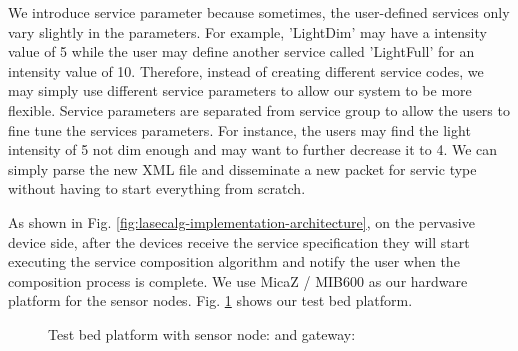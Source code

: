 We introduce service parameter because sometimes, the user-defined services only vary slightly in the parameters. For example, 'LightDim' may have a intensity value of 5 while the user may define another service called 'LightFull' for an intensity value of 10. Therefore, instead of creating different service codes, we may simply use different service parameters to allow our system to be more flexible. Service parameters are separated from service group to allow the users to fine tune the services parameters. For instance, the users may find the light intensity of 5 not dim enough and may want to further decrease it to 4. We can simply parse the new XML file and disseminate a new packet for servic type without having to start everything from scratch.

As shown in Fig. \ref{fig:lasecalg-implementation-architecture}, on the pervasive device side, after the devices receive the service specification they will start executing the service composition algorithm and notify the user when the composition process is complete. We use MicaZ / MIB600 as our hardware platform for the sensor nodes. Fig. \ref{fig:lasecalg-implementation-hardware} shows our test bed platform.

\begin{figure}
\centering
{}
\qquad
{}
\caption{Test bed platform with sensor node:  and gateway: }
\label{fig:lasecalg-implementation-hardware}
\end{figure}

